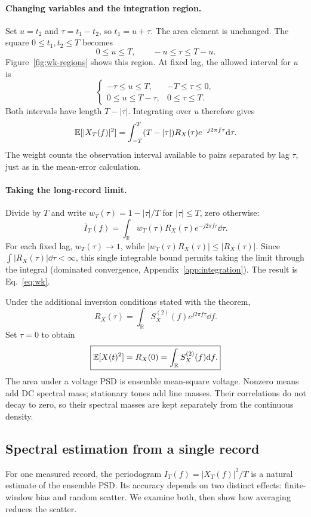 \paragraph{Changing variables and the integration region.}
Set $u=t_2$ and $\tau=t_1-t_2$, so $t_1=u+\tau$. The area element is unchanged. The square $0\leq t_1,t_2\leq T$ becomes
\[
0\leq u\leq T,\qquad -u\leq\tau\leq T-u.
\]
Figure~\ref{fig:wk-regions} shows this region. At fixed lag, the allowed interval for $u$ is
\[
\begin{cases}
-\tau\leq u\leq T,&-T\leq\tau\leq0,\\
0\leq u\leq T-\tau,&0\leq\tau\leq T.
\end{cases}
\]
Both intervals have length $T-|\tau|$. Integrating over $u$ therefore gives
\begin{equation}
\mathbb E[|X_T(f)|^2]
=\int_{-T}^T(T-|\tau|)R_X(\tau)e^{-j2\pi f\tau}\mathrm d\tau.
\label{eq:triangle}
\end{equation}
The weight counts the observation interval available to pairs separated by lag $\tau$, just as in the mean-error calculation.

\WKRegionsFigure
\paragraph{Taking the long-record limit.}
Divide by $T$ and write $w_T(\tau)=1-|\tau|/T$ for $|\tau|\leq T$, zero otherwise:
\[
\overline I_T(f)=\int_{\mathbb R}w_T(\tau)R_X(\tau)e^{-j2\pi f\tau}\dd\tau.
\]
For each fixed lag, $w_T(\tau)\to1$, while $|w_T(\tau)R_X(\tau)|\leq|R_X(\tau)|$. Since $\int|R_X(\tau)|\dd\tau<\infty$, this single integrable bound permits taking the limit through the integral (dominated convergence, Appendix~\ref{app:integration}). The result is Eq.~\eqref{eq:wk}.



Under the additional inversion conditions stated with the theorem,
\[
R_X(\tau)=\int_{\mathbb R}S_X^{(2)}(f)e^{j2\pi f\tau}\dd f.
\]
Set $\tau=0$ to obtain
\begin{equation}
\boxed{\mathbb E[X(t)^2]=R_X(0)=\int_{\mathbb R}S_X^{(2)}(f)\mathrm d f.}
\label{eq:area}
\end{equation}
The area under a voltage PSD is ensemble mean-square voltage. Nonzero means add DC spectral mass; stationary tones add line masses. Their correlations do not decay to zero, so their spectral masses are kept separately from the continuous density.

\subsection{Spectral estimation from a single record}
\label{sec:psd-measurement}
For one measured record, the periodogram $I_T(f)=|X_T(f)|^2/T$ is a natural estimate of the ensemble PSD. Its accuracy depends on two distinct effects: finite-window bias and random scatter. We examine both, then show how averaging reduces the scatter.

